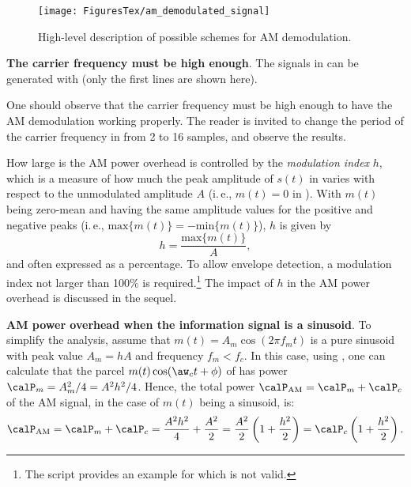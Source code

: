 \begin{figure}[htbp]
\centering
\texttt{[image: FiguresTex/am\_demodulated\_signal]}
\caption{High-level description of possible schemes for AM demodulation.\label{fig:am_demodulated_signal}}
\end{figure}

\bExample \textbf{The carrier frequency must be high enough}.
The signals in  can be generated with  (only the first lines are shown here).



One should observe that the carrier frequency must be high enough to have the AM demodulation working properly. The reader is invited to change the period of the carrier frequency in
 from 2 to 16 samples, and observe the results.
\eExample 

How large is the AM power overhead is controlled by the \emph{modulation index} $h$,
which is a measure of how much the peak amplitude of $s(t)$ in  varies with respect to the unmodulated amplitude $A$ (i.\,e., $m(t)=0$ in ). 
With $m(t)$ being zero-mean and having the same amplitude values for the positive and negative peaks (i.\,e., $\textrm{max}\{m(t)\} = -\textrm{min}\{m(t)\}$), $h$ is given by
\begin{equation}
h = \frac{\textrm{max}\{m(t)\}}{A},
\label{eq:amModulationIndex}
\end{equation}
and often expressed as a percentage. 
To allow envelope detection, a modulation index not larger than 100\% is required.\footnote{The script  provides an example for which  is not valid.}
The impact of $h$ in the AM power overhead is discussed in the sequel. 

\bExample \textbf{AM power overhead when the information signal is a sinusoid}.
To simplify the analysis, assume that $m(t)=A_m \cos(2 \pi f_m t)$ is a pure sinusoid with peak value $A_m = h A$ and frequency $f_m < f_c$. In this case, using , one can calculate that the parcel $m(t) \cos(\aw_c t + \phi)$ of  has power $\calP_m = A_m^2/4 = A^2 h^2 /4$.
Hence, the total power $\calP_{\textrm{AM}} = \calP_m + \calP_c$ of the AM signal, in the case of $m(t)$ being a sinusoid, is:
\begin{equation}
\calP_{\textrm{AM}} = \calP_m + \calP_c = \frac{A^2 h^2}{4} + \frac{A^2}{2} = \frac{A^2}{2} \left(1 + \frac{h^2}{2} \right) = \calP_c \left(1 + \frac{h^2}{2} \right).
\label{eq:amPower}
\end{equation}

